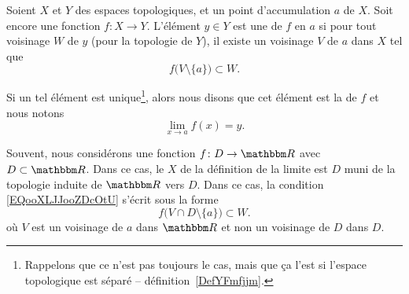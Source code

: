 \begin{definition}\label{DefYNVoWBx}
    Soient \( X\) et \( Y\) des espaces topologiques, et un point d'accumulation \( a\) de \( X\). Soit encore une fonction \( f\colon X\to Y\). L'élément \( y\in Y\) est une  de \( f\) en \( a\) si pour tout voisinage \( W\) de \( y\) (pour la topologie de \( Y\)), il existe un voisinage \( V\) de \( a\) dans \( X\) tel que
    \begin{equation}        \label{EQooXLJJooZDcOtU}
        f\big( V\setminus\{a\} \big)\subset W.
    \end{equation}

    Si un tel élément est unique\footnote{Rappelons que ce n'est pas toujours le cas, mais que ça l'est si l'espace topologique est séparé -- définition~\ref{DefYFmfjjm}.}, alors nous disons que cet élément est la  de \( f\) et nous notons
    \begin{equation}
        \lim_{x\to a} f(x)=y.
    \end{equation}
\end{definition}

\begin{normaltext}
    Souvent, nous considérons une fonction \( f\colon D\to \eR\) avec \( D\subset \eR\). Dans ce cas, le \( X\) de la définition de la limite est \( D\) muni de la topologie induite de \( \eR\) vers \( D\). Dans ce cas, la condition \eqref{EQooXLJJooZDcOtU} s'écrit sous la forme
    \begin{equation}
        f\big( V\cap D\setminus\{a\} \big)\subset W.
    \end{equation}
    où \( V\) est un voisinage de \( a\) dans \( \eR\) et non un voisinage de \( D\) dans \( D\).
\end{normaltext}


